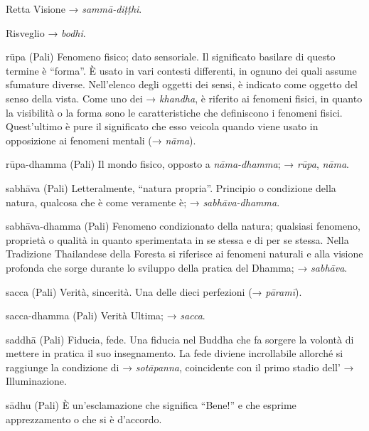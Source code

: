 \begin{glossarydescription}
\item[Retta Visione] → \emph{sammā-diṭṭhi}.

\item[Risveglio] → \emph{bodhi}.

\item[rūpa] (Pali) Fenomeno fisico; dato sensoriale. Il significato basilare
di questo termine è ``forma''. È usato in vari contesti differenti, in
ognuno dei quali assume sfumature diverse. Nell'elenco degli oggetti dei
sensi, è indicato come oggetto del senso della vista. Come uno dei →
\emph{khandha}, è riferito ai fenomeni fisici, in quanto la visibilità o
la forma sono le caratteristiche che definiscono i fenomeni fisici.
Quest'ultimo è pure il significato che esso veicola quando viene usato
in opposizione ai fenomeni mentali (→ \emph{nāma}).

\item[rūpa-dhamma] (Pali) Il mondo fisico, opposto a \emph{nāma-dhamma}; →
\emph{rūpa}, \emph{nāma}.


\item[sabhāva] (Pali) Letteralmente, ``natura propria''. Principio o
condizione della natura, qualcosa che è come veramente è; →
\emph{sabhāva-dhamma}.

\item[sabhāva-dhamma] (Pali) Fenomeno condizionato della natura;
qualsiasi fenomeno, proprietà o qualità in quanto sperimentata in se
stessa e di per se stessa. Nella Tradizione Thailandese della Foresta si
riferisce ai fenomeni naturali e alla visione profonda che sorge durante
lo sviluppo della pratica del Dhamma; → \emph{sabhāva}.

\item[sacca] (Pali) Verità, sincerità. Una delle dieci perfezioni (→
\emph{pāramī}).

\item[sacca-dhamma] (Pali) Verità Ultima; → \emph{sacca}.

\item[saddhā] (Pali) Fiducia, fede. Una fiducia nel Buddha che fa sorgere la
volontà di mettere in pratica il suo insegnamento. La fede diviene
incrollabile allorché si raggiunge la condizione di → \emph{sotāpanna},
coincidente con il primo stadio dell' → Illuminazione.

\item[sādhu] (Pali) È un'esclamazione che significa ``Bene!'' e che esprime
apprezzamento o che si è d'accordo.


\end{glossarydescription}
